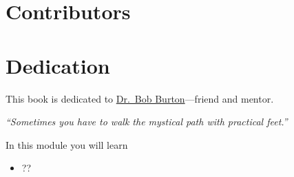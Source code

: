\documentclass{workbook}
\begin{document}






\hypersetup{bookmarksdepth=3}

\pagestyle{empty}



\newpage

\begin{bookonly}
	\clearpage
	\hbox{}
	\newpage
	
	\section*{Contributors}
	
	\section*{Dedication}
	\begin{center}
		This book is dedicated to
		\href{https://www.gazettetimes.com/news/local/obituaries/dr-robert-main-burton/article_9c087f07-c005-515a-bb3f-2c9c6a6b7332.html}{\color{blue}Dr.~Bob Burton}---friend and mentor.

		\emph{\large ``Sometimes you have to walk the mystical path with practical feet.''}
	\end{center}
	\newpage
	\mbox{}
	{
		\pagestyle{empty}
		\setcounter{tocdepth}{1}
		\tableofcontents
		\thispagestyle{empty}
	}
	\newpage
	\mbox{}
	\newpage
\end{bookonly}

\setcounter{page}{1}
\pagestyle{siefken}



\begin{module}\label{module1}

	In this module you will learn
	\begin{itemize}
		\item ??
	\end{itemize}

	
\end{module}

%
%
\end{document}
